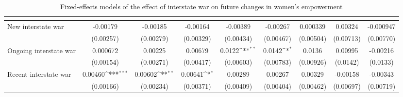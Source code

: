 \begin{table}[htbp]\centering
\def\sym#1{\ifmmode^{#1}\else\(^{#1}\)\fi}
\caption{Fixed-effects models of the effect of interstate war on future changes in women's empowerment\label{interwarpolempower}}
\begin{tabular}{l*{8}{c}}
\hline\hline
                    &&&&&&&&\\
\hline
New interstate war          &    -0.00179         &    -0.00185         &    -0.00164         &    -0.00389         &    -0.00267         &    0.000339         &     0.00324         &   -0.000947         \\
                    &   (0.00257)         &   (0.00279)         &   (0.00329)         &   (0.00434)         &   (0.00467)         &   (0.00504)         &   (0.00713)         &   (0.00770)         \\
[1em]
Ongoing interstate war          &    0.000672         &     0.00225         &     0.00679         &      0.0122\sym{**} &      0.0142\sym{*}  &      0.0136         &     0.00995         &    -0.00216         \\
                    &   (0.00154)         &   (0.00271)         &   (0.00417)         &   (0.00603)         &   (0.00783)         &   (0.00926)         &    (0.0142)         &    (0.0133)         \\
[1em]
Recent interstate war       &     0.00460\sym{***}&     0.00602\sym{**} &     0.00641\sym{*}  &     0.00289         &     0.00267         &     0.00329         &    -0.00158         &    -0.00343         \\
                    &   (0.00166)         &   (0.00234)         &   (0.00371)         &   (0.00409)         &   (0.00404)         &   (0.00462)         &   (0.00697)         &   (0.00719)         \\

\end{tabular}
\end{table}

